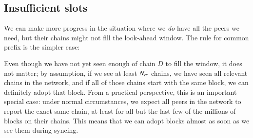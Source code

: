 \subsection{Insufficient slots}

We can make more progress in the situation where we \emph{do} have all the peers
we need, but their chains might not fill the look-ahead window. The rule for
common prefix is the simpler case:
%
\begin{center}
\end{center}
%
Even though we have not yet seen enough of chain $D$ to fill the window, it does
not matter; by assumption, if we see at least $N_\mathit{rs}$ chains, we have
seen all relevant chains in the network, and if all of those chains start with
the same block, we can definitely adopt that block. From a practical
perspective, this is an important special case: under normal circumstances, we
expect all peers in the network to report the exact same chain, at least for all
but the last few of the millions of blocks on their chains. This means that we
can adopt blocks almost as soon as we see them during syncing.

\pagebreak

